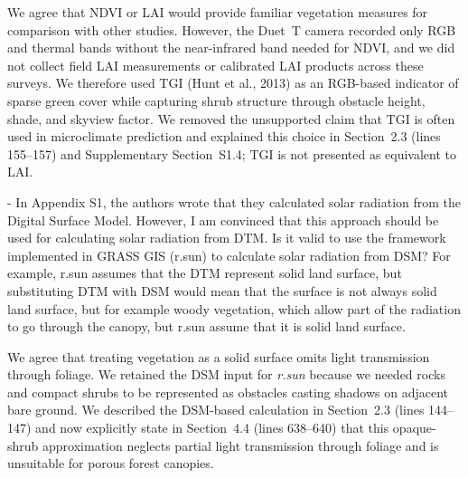 \documentclass[12pt,english]{reviewresponse}
\begin{document}
\begin{revresponse}
We agree that NDVI or LAI would provide familiar vegetation measures for comparison with other studies. However, the Duet~T camera recorded only RGB and thermal bands without the near-infrared band needed for NDVI, and we did not collect field LAI measurements or calibrated LAI products across these surveys. We therefore used TGI (Hunt et al., 2013) as an RGB-based indicator of sparse green cover while capturing shrub structure through obstacle height, shade, and skyview factor. We removed the unsupported claim that TGI is often used in microclimate prediction and explained this choice in Section~2.3 (lines 155--157) and Supplementary Section~S1.4; TGI is not presented as equivalent to LAI.
\end{revresponse}

\begin{revcomment}
- In Appendix S1, the authors wrote that they calculated solar radiation from the Digital Surface Model. However, I am convinced that this approach should be used for calculating solar radiation from DTM. Is it valid to use the framework implemented in GRASS GIS (r.sun) to calculate solar radiation from DSM? For example, r.sun assumes that the DTM represent solid land surface, but substituting DTM with DSM would mean that the surface is not always solid land surface, but for example woody vegetation, which allow part of the radiation to go through the canopy, but r.sun assume that it is solid land surface.
\end{revcomment}

\begin{revresponse}
We agree that treating vegetation as a solid surface omits light transmission through foliage. We retained the DSM input for \textit{r.sun} because we needed rocks and compact shrubs to be represented as obstacles casting shadows on adjacent bare ground. We described the DSM-based calculation in Section~2.3 (lines 144--147) and now explicitly state in Section~4.4 (lines 638--640) that this opaque-shrub approximation neglects partial light transmission through foliage and is unsuitable for porous forest canopies.
\end{revresponse}
\end{document}
